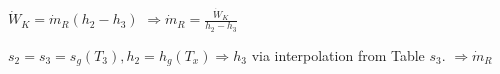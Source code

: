 \( \dot{W}_K = \dot{m}_R (h_2 - h_3) \)  
\( \Rightarrow \dot{m}_R = \frac{\dot{W}_K}{h_2 - h_3} \)  

\( s_2 = s_3 = s_g(T_3), h_2 = h_g(T_x) \Rightarrow h_3 \) via interpolation from Table \( s_3 \).  
\( \Rightarrow \dot{m}_R \)